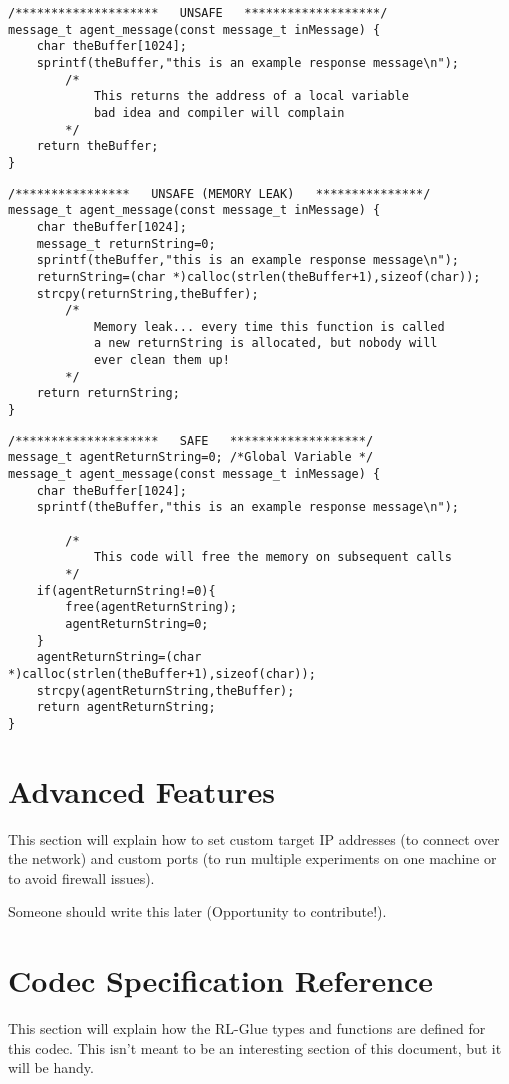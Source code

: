 \documentclass[11pt]{article}
\begin{document}
\begin{verbatim}
/********************   UNSAFE   *******************/
message_t agent_message(const message_t inMessage) {
    char theBuffer[1024];
    sprintf(theBuffer,"this is an example response message\n");
        /*
            This returns the address of a local variable
            bad idea and compiler will complain
        */
    return theBuffer;
}
\end{verbatim}

\begin{verbatim}
/****************   UNSAFE (MEMORY LEAK)   ***************/
message_t agent_message(const message_t inMessage) {
    char theBuffer[1024];
    message_t returnString=0;
    sprintf(theBuffer,"this is an example response message\n");
    returnString=(char *)calloc(strlen(theBuffer+1),sizeof(char));
    strcpy(returnString,theBuffer);
        /*
            Memory leak... every time this function is called
            a new returnString is allocated, but nobody will
            ever clean them up!
        */
    return returnString;
}
\end{verbatim}

\begin{verbatim}
/********************   SAFE   *******************/
message_t agentReturnString=0; /*Global Variable */	
message_t agent_message(const message_t inMessage) {
    char theBuffer[1024];
    sprintf(theBuffer,"this is an example response message\n");

        /*
            This code will free the memory on subsequent calls
        */
    if(agentReturnString!=0){
        free(agentReturnString);
        agentReturnString=0;
    }
    agentReturnString=(char *)calloc(strlen(theBuffer+1),sizeof(char));
    strcpy(agentReturnString,theBuffer);
    return agentReturnString;
}
\end{verbatim}


\section{Advanced Features}
This section will explain how to set custom target IP addresses (to connect over the network) and custom ports (to run multiple experiments on one machine or to avoid firewall issues).

Someone should write this later (Opportunity to contribute!).

\section{Codec Specification Reference}
This section will explain how the RL-Glue types and functions are defined for this codec.  This isn't meant to be an interesting section of this document, but it will
be handy.
\end{document}
